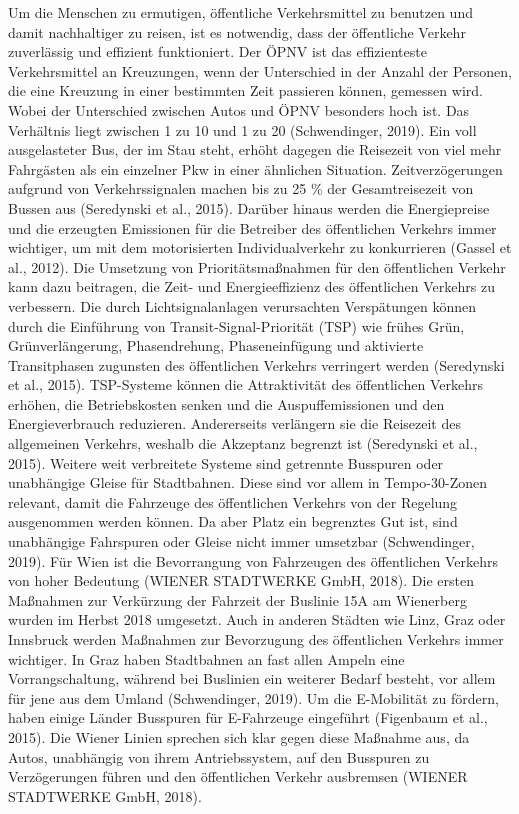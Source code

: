 \documentclass[
]{book}
\begin{document}
Um die Menschen zu ermutigen, öffentliche Verkehrsmittel zu benutzen und damit nachhaltiger zu reisen, ist es notwendig, dass der öffentliche Verkehr zuverlässig und effizient funktioniert. Der ÖPNV ist das effizienteste Verkehrsmittel an Kreuzungen, wenn der Unterschied in der Anzahl der Personen, die eine Kreuzung in einer bestimmten Zeit passieren können, gemessen wird. Wobei der Unterschied zwischen Autos und ÖPNV besonders hoch ist. Das Verhältnis liegt zwischen 1 zu 10 und 1 zu 20 (Schwendinger, 2019). Ein voll ausgelasteter Bus, der im Stau steht, erhöht dagegen die Reisezeit von viel mehr Fahrgästen als ein einzelner Pkw in einer ähnlichen Situation. Zeitverzögerungen aufgrund von Verkehrssignalen machen bis zu 25 \% der Gesamtreisezeit von Bussen aus (Seredynski et al., 2015). Darüber hinaus werden die Energiepreise und die erzeugten Emissionen für die Betreiber des öffentlichen Verkehrs immer wichtiger, um mit dem motorisierten Individualverkehr zu konkurrieren (Gassel et al., 2012).
Die Umsetzung von Prioritätsmaßnahmen für den öffentlichen Verkehr kann dazu beitragen, die Zeit- und Energieeffizienz des öffentlichen Verkehrs zu verbessern. Die durch Lichtsignalanlagen verursachten Verspätungen können durch die Einführung von Transit-Signal-Priorität (TSP) wie frühes Grün, Grünverlängerung, Phasendrehung, Phaseneinfügung und aktivierte Transitphasen zugunsten des öffentlichen Verkehrs verringert werden (Seredynski et al., 2015). TSP-Systeme können die Attraktivität des öffentlichen Verkehrs erhöhen, die Betriebskosten senken und die Auspuffemissionen und den Energieverbrauch reduzieren. Andererseits verlängern sie die Reisezeit des allgemeinen Verkehrs, weshalb die Akzeptanz begrenzt ist (Seredynski et al., 2015). Weitere weit verbreitete Systeme sind getrennte Busspuren oder unabhängige Gleise für Stadtbahnen. Diese sind vor allem in Tempo-30-Zonen relevant, damit die Fahrzeuge des öffentlichen Verkehrs von der Regelung ausgenommen werden können. Da aber Platz ein begrenztes Gut ist, sind unabhängige Fahrspuren oder Gleise nicht immer umsetzbar (Schwendinger, 2019).
Für Wien ist die Bevorrangung von Fahrzeugen des öffentlichen Verkehrs von hoher Bedeutung (WIENER STADTWERKE GmbH, 2018). Die ersten Maßnahmen zur Verkürzung der Fahrzeit der Buslinie 15A am Wienerberg wurden im Herbst 2018 umgesetzt. Auch in anderen Städten wie Linz, Graz oder Innsbruck werden Maßnahmen zur Bevorzugung des öffentlichen Verkehrs immer wichtiger. In Graz haben Stadtbahnen an fast allen Ampeln eine Vorrangschaltung, während bei Buslinien ein weiterer Bedarf besteht, vor allem für jene aus dem Umland (Schwendinger, 2019). Um die E-Mobilität zu fördern, haben einige Länder Busspuren für E-Fahrzeuge eingeführt (Figenbaum et al., 2015). Die Wiener Linien sprechen sich klar gegen diese Maßnahme aus, da Autos, unabhängig von ihrem Antriebssystem, auf den Busspuren zu Verzögerungen führen und den öffentlichen Verkehr ausbremsen (WIENER STADTWERKE GmbH, 2018).
\end{document}
